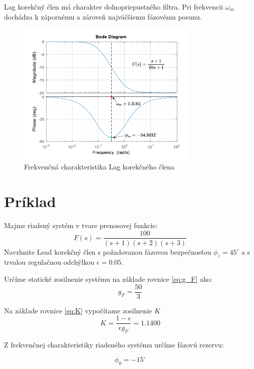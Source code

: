 \documentclass[a4paper,10pt]{article}
\begin{document}
Lag korekčný člen má charakter dolnopriepustného filtra. Pri frekvencii $\omega_m$ dochádza k zápornému a zároveň najväčšiemu fázovému posunu.
\begin{figure}[ht]
\centering
\includegraphics[width=0.77\textwidth]{LagBode}
\caption{Frekvenčná charakteristika Lag korekčného člena}
\end{figure}

\pagebreak

\section{Príklad}

Majme riadený systém v tvare prenosovej funkcie:
\begin{equation}
 F(s)=\frac{100}{(s+1)(s+2)(s+3)}
\end{equation}
Navrhnite Lead korekčný člen s požadovanou fázovou bezpečnosťou $\phi_z=45^\circ$ a s trvalou regulačnou odchýlkou $\epsilon=0.05$.

Určíme statické zosilnenie systému na základe rovnice \eqref{eq:g_F} ako:
\begin{equation}
   g_F=\frac{50}{3}
\end{equation}

Na základe rovnice \eqref{eq:K} vypočítame zosilnenie $K$
\begin{equation}
 K=\frac{1-\epsilon}{\epsilon g_F}=1.1400
\end{equation}

Z frekvenčnej charakteristiky riadeného systému určíme fázovú rezervu:

\begin{equation}
 \phi_0=-15^\circ
\end{equation}
\end{document}

